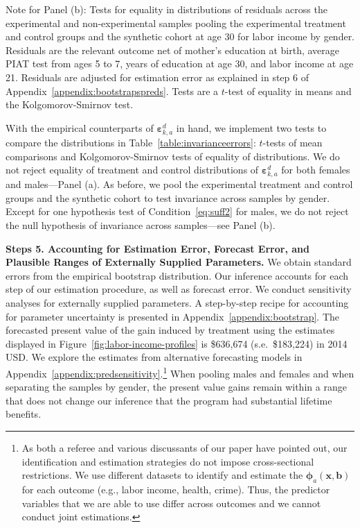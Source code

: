 \begin{table}[H]
\begin{threeparttable}
\begin{tablenotes}
Note for Panel (b): Tests for equality in distributions of residuals across the experimental and non-experimental samples pooling the experimental treatment and control groups and the synthetic cohort at age 30 for labor income by gender.  Residuals are the relevant outcome net of mother's education at birth, average PIAT test from ages 5 to 7, years of education at age 30, and labor income at age 21. Residuals are adjusted for estimation error as explained in step 6 of Appendix~\ref{appendix:bootstrapspreds}. Tests are a $t$-test of equality in means and the Kolgomorov-Smirnov test.\\
\end{tablenotes}
\end{threeparttable}
\end{table}

With the empirical counterparts of $\bm{\varepsilon}_{k,a}^d$ in hand, we implement two tests to compare the distributions in Table~\ref{table:invarianceerrors}: $t$-tests of mean comparisons and Kolgomorov-Smirnov tests of equality of distributions. We do not reject equality of treatment and control distributions of $\bm{\varepsilon}_{k,a}^d$ for both females and males---Panel (a). As before, we pool the experimental treatment and control groups and the synthetic cohort to test invariance across samples by gender. Except for one hypothesis test of Condition~\eqref{eq:suff2} for males, we do not reject the null hypothesis of invariance across samples---see Panel (b).

\textbf{Steps 5. Accounting for Estimation Error, Forecast Error, and Plausible Ranges of Externally Supplied Parameters.} We obtain standard errors from the empirical bootstrap distribution. Our inference accounts for each step of our estimation procedure, as well as forecast error. We conduct sensitivity analyses for externally supplied parameters. A step-by-step recipe for accounting for parameter uncertainty is presented in Appendix~\ref{appendix:bootstrap}. The forecasted present value of the gain induced by treatment using the estimates displayed in Figure~\ref{fig:labor-income-profiles} is \$636,674 (s.e.\ \$183,224) in 2014 USD. We explore the estimates from alternative forecasting models in Appendix~\ref{appendix:predsensitivity}.\footnote{As both a referee and various discussants of our paper have pointed out, our identification and estimation strategies do not impose cross-sectional restrictions. We use different datasets to identify and estimate the  $\bm{\phi}_{a} \left( \bm{x}, \bm{b} \right)$ for each outcome (e.g., labor income, health, crime). Thus, the predictor variables that we are able to use differ across outcomes and we cannot conduct joint estimations.} When pooling males and females and when separating the samples by gender, the present value gains remain within a range that does not change our inference that the program had substantial lifetime benefits.

